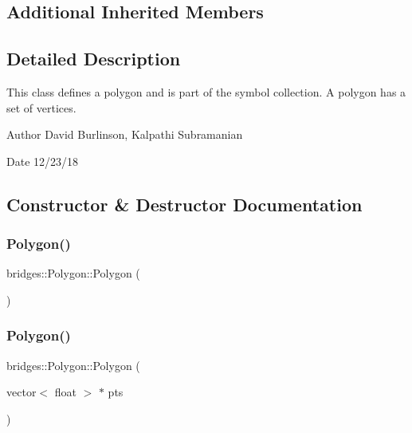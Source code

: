 \subsection*{Additional Inherited Members}


\subsection{Detailed Description}
This class defines a polygon and is part of the symbol collection. A polygon has a set of vertices. 

\begin{DoxyAuthor}{Author}
David Burlinson, Kalpathi Subramanian 
\end{DoxyAuthor}
\begin{DoxyDate}{Date}
12/23/18 
\end{DoxyDate}


\subsection{Constructor \& Destructor Documentation}
\mbox{\label{classbridges_1_1_polygon_ade0fbaaa5a1b638ec6faec52ee6950f3}} 
\subsubsection{\texorpdfstring{Polygon()}{Polygon()}\hspace{0.1cm}{\footnotesize\ttfamily [1/2]}}
{\footnotesize\ttfamily bridges\+::\+Polygon\+::\+Polygon (\begin{DoxyParamCaption}{ }\end{DoxyParamCaption})\hspace{0.3cm}{\ttfamily [inline]}}

\mbox{\label{classbridges_1_1_polygon_acd99b72ad6c6d0ecc9cdc7a19b5bbcaf}} 
\subsubsection{\texorpdfstring{Polygon()}{Polygon()}\hspace{0.1cm}{\footnotesize\ttfamily [2/2]}}
{\footnotesize\ttfamily bridges\+::\+Polygon\+::\+Polygon (\begin{DoxyParamCaption}\item[{vector$<$ float $>$ $\ast$}]{pts }\end{DoxyParamCaption})\hspace{0.3cm}{\ttfamily [inline]}}



